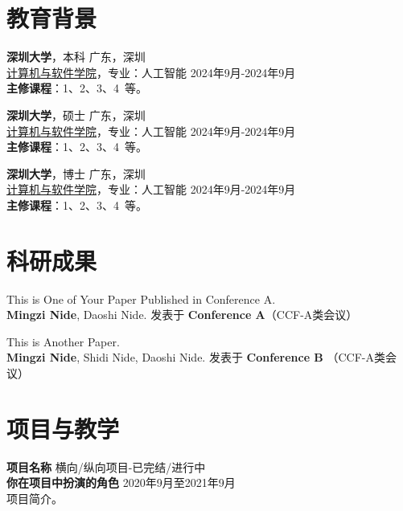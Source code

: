 \section{\makebox[\widthof{\faGraduationCap}][c]{\color{SZU_Pink}{\faGraduationCap}}\quad 教育背景}
\vspace{0.5em}
{\large \textbf{深圳大学}}，本科 \hfill {广东，深圳} \\
{{\href{https://csse.szu.edu.cn/}{计算机与软件学院}}}，专业：人工智能 \hfill {2024年9月-2024年9月} \\
\textbf{主修课程}：1、2、3、4\ 等。

\vspace{0.5em}
{\large \textbf{深圳大学}}，硕士 \hfill {广东，深圳} \\
{{\href{https://csse.szu.edu.cn/}{计算机与软件学院}}}，专业：人工智能 \hfill {2024年9月-2024年9月} \\
\textbf{主修课程}：1、2、3、4\ 等。

\vspace{0.5em}
{\large \textbf{深圳大学}}，博士 \hfill {广东，深圳} \\
{{\href{https://csse.szu.edu.cn/}{计算机与软件学院}}}，专业：人工智能 \hfill {2024年9月-2024年9月} \\
\textbf{主修课程}：1、2、3、4\ 等。

\section{\makebox[\widthof{\faGraduationCap}][c]{\color{SZU_Pink}{\faGraduationCap}}\quad 科研成果}
\vspace{0.5em}
This is One of Your Paper Published in Conference A. \\
\textbf{Mingzi Nide}, Daoshi Nide. \hfill 发表于 \textbf{Conference A}（CCF-A类会议）

\vspace{0.5em}
This is Another Paper. \\
\textbf{Mingzi Nide}, Shidi Nide, Daoshi Nide. \hfill 发表于 \textbf{Conference B} （CCF-A类会议）

\section{\makebox[\widthof{\faChalkboardTeacher}][c]{\color{SZU_Pink}{\faChalkboardTeacher}}\quad 项目与教学}
\vspace{0.5em}
{\large{\textbf{项目名称}}} \hfill {横向/纵向项目-已完结/进行中}\\
\textbf{你在项目中扮演的角色} \hfill 2020年9月至2021年9月\\
项目简介。


